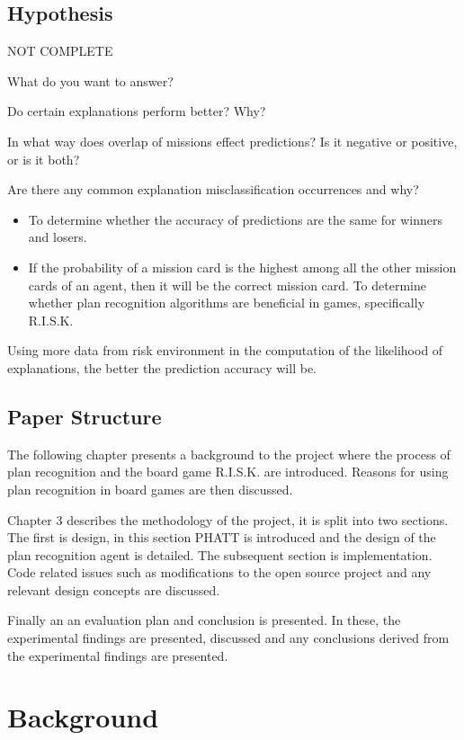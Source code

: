 \documentclass[parskip]{cs4rep}
\begin{document}
\section{Hypothesis}

NOT COMPLETE

What do you want to answer?

Do certain explanations perform better? Why?

In what way does overlap of missions effect predictions? Is it negative or positive, or is it both?

Are there any common explanation misclassification occurrences and why?

\begin{itemize}
\item
To determine whether the accuracy of predictions are the same for winners and losers.
\item
If the probability of a mission card is the highest among all the other mission cards of an agent, then it will be the correct mission card.
\newline
To determine whether plan recognition algorithms are beneficial in games, specifically R.I.S.K.
\end{itemize}

Using more data from risk environment in the computation of the likelihood of explanations, the better the prediction accuracy will be.

\section{Paper Structure}

The following chapter presents a background to the project where the process of plan recognition and the board game R.I.S.K. are introduced. Reasons for using plan recognition in board games are then discussed.

Chapter 3 describes the methodology of the project, it is split into two sections. The first is design, in this section PHATT is introduced and the design of the plan recognition agent is detailed. The subsequent section is implementation. Code related issues such as modifications to the open source project and any relevant design concepts are discussed. 

Finally an an evaluation plan and conclusion is presented. In these, the experimental findings are presented, discussed and any conclusions derived from the experimental findings are presented.

\chapter{Background}
\end{document}
